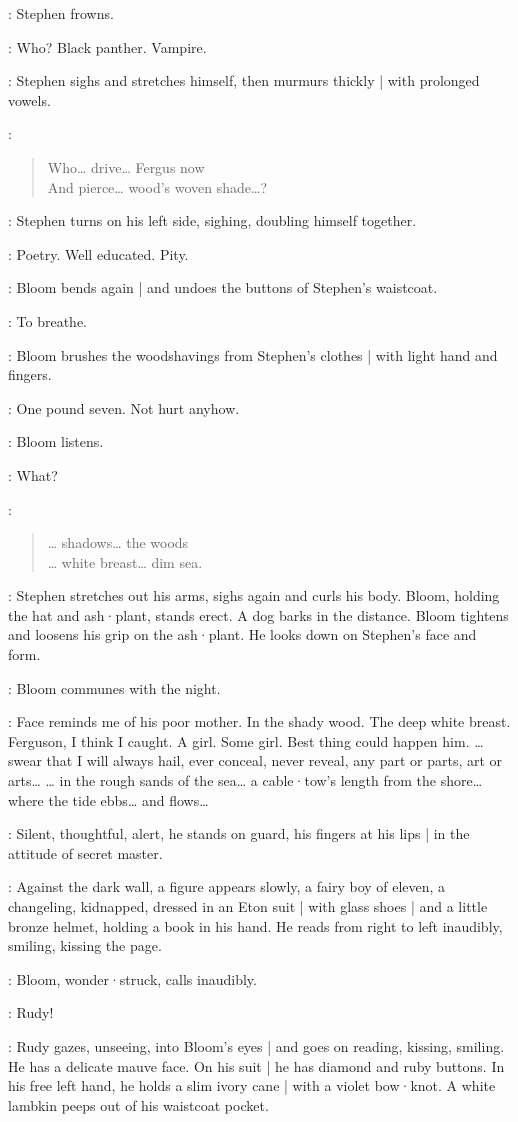 :
Stephen frowns.

\Stephen:
Who?
Black panther.
Vampire.

:
Stephen sighs and stretches himself,
then murmurs thickly |
with prolonged vowels.

\Stephen:
\begin{verse}
    Who… drive… Fergus now\\
    And pierce… wood's woven shade…?
\end{verse}

:
Stephen turns on his left side,
sighing,
doubling himself together.

\Bloom:
Poetry.
Well educated.
Pity.

:
Bloom bends again |
and undoes the buttons of Stephen's waistcoat.

\Bloom:
To breathe.

:
Bloom brushes the woodshavings from Stephen's clothes |
with light hand and fingers.

\Bloom:
One pound seven.
Not hurt anyhow.

:
Bloom listens.

\Bloom:
What?

\Stephen:
\begin{verse}
   … shadows… the woods\\
   … white breast… dim sea.
\end{verse}

:
Stephen stretches out his arms,
sighs again and curls his body.
Bloom,
holding the hat and ash·plant,
stands erect.
A dog barks in the distance.
Bloom tightens and loosens his grip on the ash·plant.
He looks down on Stephen's face and form.

:
Bloom communes with the night.

\Bloom:
Face reminds me of his poor mother.
In the shady wood.
The deep white breast.
Ferguson,
I think I caught.
%
A girl.
Some girl.
Best thing could happen him.
… swear that I will always hail,
ever conceal,
never reveal,
any part or parts,
art or arts…
… in the rough sands of the sea…
a cable·tow's length from the shore…
where the tide ebbs…
and flows…

:
Silent,
thoughtful,
alert,
he stands on guard,
his fingers at his lips |
in the attitude of secret master.

:
Against the dark wall,
a figure appears slowly,
a fairy boy of eleven,
a changeling,
kidnapped,
dressed in an Eton suit |
with glass shoes |
and a little bronze helmet,
holding a book in his hand.
He reads from right to left inaudibly,
smiling,
kissing the page.%

:
Bloom,
wonder·struck,
calls inaudibly.

\Bloom:
Rudy!

:
Rudy gazes,
unseeing,
into Bloom's eyes |
and goes on reading,
kissing,
smiling.
He has a delicate mauve face.
On his suit |
he has diamond and ruby buttons.
In his free left hand,
he holds a slim ivory cane |
with a violet bow·knot.
A white lambkin peeps out of his waistcoat pocket.
